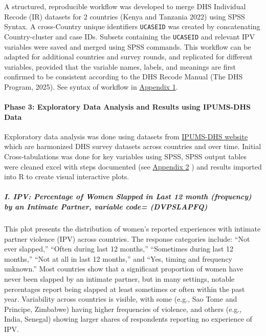 \documentclass[
]{article}
\begin{document}
A structured, reproducible workflow was developed to merge DHS
Individual Recode (IR) datasets for 2 countries (Kenya and Tanzania
2022) using SPSS Syntax. A cross-Country unique identifiers
\texttt{UCASEID} was created by concatenating Country-cluster and case
IDs. Subsets containing the \texttt{UCASEID} and relevant IPV variables
were saved and merged using SPSS commands. This workflow can be adapted
for additional countries and survey rounds, and replicated for different
variables, provided that the variable names, labels, and meanings are
first confirmed to be consistent according to the DHS Recode Manual (The
DHS Program, 2025). See syntax of workflow in
\href{Appendix\%201}{Appendix 1}.

\paragraph{Phase 3: Exploratory Data Analysis and Results using
IPUMS-DHS
Data}\label{phase-3-exploratory-data-analysis-and-results-using-ipums-dhs-data}

Exploratory data analysis was done using datasets from
\href{https://www.idhsdata.org/idhs/}{IPUMS-DHS website} which are
harmonized DHS survey datasets across countries and over time. Initial
Cross-tabulations was done for key variables using SPSS, SPSS output
tables were cleaned excel with steps documented (see
\href{Appendix\%202}{Appendix 2} ) and results imported into R to create
visual interactive plots.

\subparagraph{I. IPV: Percentage of Women Slapped in Last 12 month
(frequency) by an Intimate Partner, variable code=
(DVPSLAPFQ)}\label{i.-ipv-percentage-of-women-slapped-in-last-12-month-frequency-by-an-intimate-partner-variable-code-dvpslapfq}

This plot presents the distribution of women's reported experiences with
intimate partner violence (IPV) across countries. The response
categories include: ``Not ever slapped,'' ``Often during last 12
months,'' ``Sometimes during last 12 months,'' ``Not at all in last 12
months,'' and ``Yes, timing and frequency unknown.'' Most countries show
that a significant proportion of women have never been slapped by an
intimate partner, but in many settings, notable percentages report being
slapped at least sometimes or often within the past year. Variability
across countries is visible, with some (e.g., Sao Tome and Principe,
Zimbabwe) having higher frequencies of violence, and others (e.g.,
India, Senegal) showing larger shares of respondents reporting no
experience of IPV.
\end{document}
